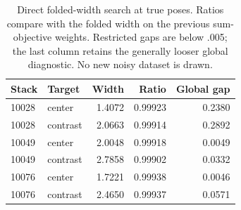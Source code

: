 \begin{table}[t]
\centering\small
\caption{Direct folded-width search at true poses. Ratios compare with the folded width on the previous sum-objective weights. Restricted gaps are below .005; the last column retains the generally looser global diagnostic. No new noisy dataset is drawn.}
\label{tab:foldedridge}
\begin{tabular}{llrrr}
\toprule
Stack & Target & Width & Ratio & Global gap\\
\midrule
10028 & center & 1.4072 & 0.99923 & 0.2380 \\
10028 & contrast & 2.0663 & 0.99914 & 0.2892 \\
10049 & center & 2.0048 & 0.99918 & 0.0049 \\
10049 & contrast & 2.7858 & 0.99902 & 0.0332 \\
10076 & center & 1.7221 & 0.99938 & 0.0046 \\
10076 & contrast & 2.4650 & 0.99937 & 0.0571 \\
\bottomrule
\end{tabular}
\end{table}

